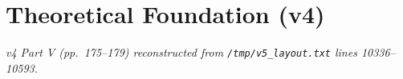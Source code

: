 \part{Theoretical Foundation (v4)}
\noindent\textit{v4 Part V (pp.~175--179) reconstructed from
\texttt{/tmp/v5\_layout.txt} lines 10336--10593.}



